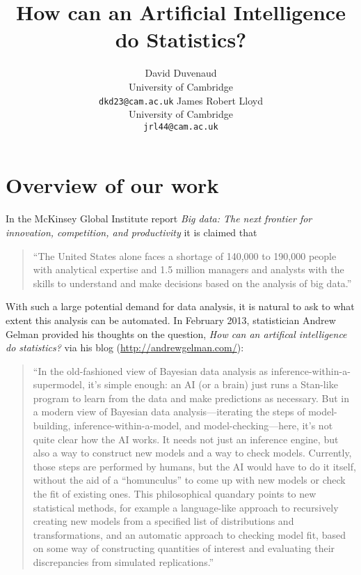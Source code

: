 \documentclass{article} %
\title{How can an Artificial Intelligence do Statistics?}
\author{
David Duvenaud\\
University of Cambridge \\
\texttt{dkd23@cam.ac.uk}
\And
James Robert Lloyd\\
University of Cambridge\\
\texttt{jrl44@cam.ac.uk}
}
\begin{document}
\allowdisplaybreaks

\maketitle


\section{Overview of our work}

In the McKinsey Global Institute report \emph{Big data: The next frontier for innovation, competition, and productivity} it is claimed that
\begin{quotation}
``The United States alone faces a shortage of 140,000 to 190,000 people with analytical expertise and 1.5 million managers and analysts with the skills to understand and make decisions based on the analysis of big data.''
\end{quotation}

With such a large potential demand for data analysis, it is natural to ask to what extent this analysis can be automated.
In February 2013, statistician Andrew Gelman provided his thoughts on the question, \emph{How can an artifical intelligence do statistics?} via his blog (\url{http://andrewgelman.com/}):

\begin{quotation}
``In the old-fashioned view of Bayesian data analysis as inference-within-a-supermodel, it’s simple enough: an AI (or a brain) just runs a Stan-like program to learn from the data and make predictions as necessary.
But in a modern view of Bayesian data analysis---iterating the steps of model-building, inference-within-a-model, and model-checking---here, it’s not quite clear how the AI works.
It needs not just an inference engine, but also a way to construct new models and a way to check models.
Currently, those steps are performed by humans, but the AI would have to do it itself, without the aid of a “homunculus” to come up with new models or check the fit of existing ones.
This philosophical quandary points to new statistical methods, for example a language-like approach to recursively creating new models from a specified list of distributions and transformations, and an automatic approach to checking model fit, based on some way of constructing quantities of interest and evaluating their discrepancies from simulated replications.''
\end{quotation}
\end{document}
